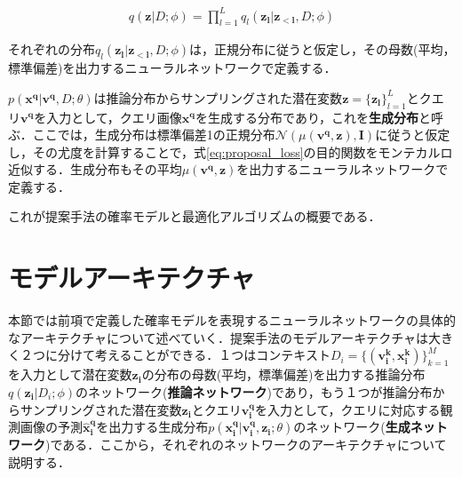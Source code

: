 
\begin{eqnarray}
q ( \bm{z} | D ; \phi ) = \prod_{l=1}^L q_l ( \bm{z_l} | \bm{z_{<l}}, D ; \phi )
\end{eqnarray}

それぞれの分布$q_l ( \bm{z_l} | \bm{z_{<l}}, D ; \phi )$は，正規分布に従うと仮定し，その母数(平均，標準偏差)を出力するニューラルネットワークで定義する．

$p ( \bm{x ^ q} | \bm{v ^ q}, D; \theta )$は推論分布からサンプリングされた潜在変数$\bm{z} = \{ \bm{z_l} \}_{l=1}^L$とクエリ$\bm{v^q}$を入力として，クエリ画像$\bm{x^q}$を生成する分布であり，これを{\bf 生成分布}と呼ぶ．ここでは，生成分布は標準偏差1の正規分布$\mathcal{N}(\mu(\bm{v^q}, \bm{z}), \bm{I})$に従うと仮定し，その尤度を計算することで，式\ref{eq:proposal_loss}の目的関数をモンテカルロ近似する．生成分布もその平均$\mu(\bm{v^q}, \bm{z})$を出力するニューラルネットワークで定義する．


これが提案手法の確率モデルと最適化アルゴリズムの概要である．

\section{モデルアーキテクチャ}
本節では前項で定義した確率モデルを表現するニューラルネットワークの具体的なアーキテクチャについて述べていく．提案手法のモデルアーキテクチャは大きく２つに分けて考えることができる．１つはコンテキスト$D_i = \{ (\bm{ v _ { i } ^ { k } }, \bm{x _ { i } ^ { k } }) \}_{k=1}^M$を入力として潜在変数$\bm{z_i}$の分布の母数(平均，標準偏差)を出力する推論分布$q \left( \bm{z_i} | D_i ; \phi \right)$のネットワーク({\bf 推論ネットワーク})であり，もう１つが推論分布からサンプリングされた潜在変数$\bm{z_i}$とクエリ$\bm{v_i^q}$を入力として，クエリに対応する観測画像の予測$\bm{\hat{x}_i^q}$を出力する生成分布$p \left( \bm{x _i ^ q} | \bm{v _i ^ q} , \bm{z _ i} ; \theta \right)$のネットワーク({\bf 生成ネットワーク})である．ここから，それぞれのネットワークのアーキテクチャについて説明する．

